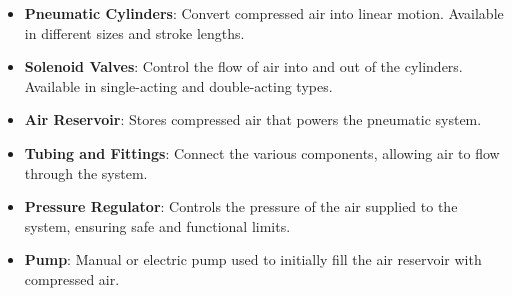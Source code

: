 \begin{itemize}
    \item \textbf{Pneumatic Cylinders}: Convert compressed air into linear motion. Available in different sizes and stroke lengths.
    \item \textbf{Solenoid Valves}: Control the flow of air into and out of the cylinders. Available in single-acting and double-acting types.
    \item \textbf{Air Reservoir}: Stores compressed air that powers the pneumatic system.
    \item \textbf{Tubing and Fittings}: Connect the various components, allowing air to flow through the system.
    \item \textbf{Pressure Regulator}: Controls the pressure of the air supplied to the system, ensuring safe and functional limits.
    \item \textbf{Pump}: Manual or electric pump used to initially fill the air reservoir with compressed air.
\end{itemize}
\centering \textbf{}
